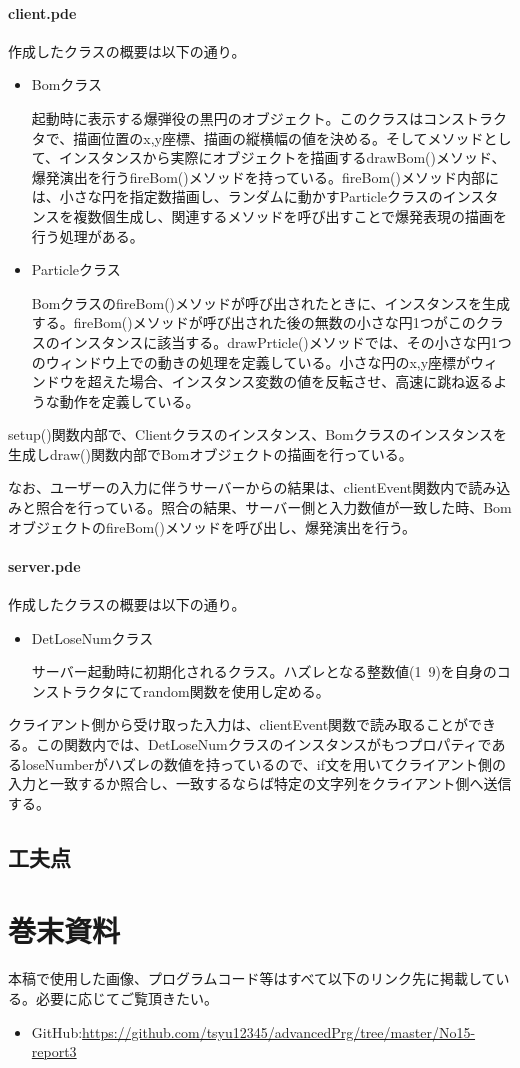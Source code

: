 \documentclass[dvipdfmx]{jsarticle}
\begin{document}
\paragraph{client.pde}
作成したクラスの概要は以下の通り。
\begin{itemize}
  \item Bomクラス\par
  起動時に表示する爆弾役の黒円のオブジェクト。このクラスはコンストラクタで、描画位置のx,y座標、描画の縦横幅の値を決める。そしてメソッドとして、インスタンスから実際にオブジェクトを描画するdrawBom()メソッド、爆発演出を行うfireBom()メソッドを持っている。fireBom()メソッド内部には、小さな円を指定数描画し、ランダムに動かすParticleクラスのインスタンスを複数個生成し、関連するメソッドを呼び出すことで爆発表現の描画を行う処理がある。
  \item Particleクラス\par
  BomクラスのfireBom()メソッドが呼び出されたときに、インスタンスを生成する。fireBom()メソッドが呼び出された後の無数の小さな円1つがこのクラスのインスタンスに該当する。drawPrticle()メソッドでは、その小さな円1つのウィンドウ上での動きの処理を定義している。小さな円のx,y座標がウィンドウを超えた場合、インスタンス変数の値を反転させ、高速に跳ね返るような動作を定義している。
\end{itemize}
setup()関数内部で、Clientクラスのインスタンス、Bomクラスのインスタンスを生成しdraw()関数内部でBomオブジェクトの描画を行っている。\par
なお、ユーザーの入力に伴うサーバーからの結果は、clientEvent関数内で読み込みと照合を行っている。照合の結果、サーバー側と入力数値が一致した時、BomオブジェクトのfireBom()メソッドを呼び出し、爆発演出を行う。
\paragraph{server.pde}
作成したクラスの概要は以下の通り。
\begin{itemize}
  \item DetLoseNumクラス\par
  サーバー起動時に初期化されるクラス。ハズレとなる整数値(1~9)を自身のコンストラクタにてrandom関数を使用し定める。
\end{itemize}
クライアント側から受け取った入力は、clientEvent関数で読み取ることができる。この関数内では、DetLoseNumクラスのインスタンスがもつプロパティであるloseNumberがハズレの数値を持っているので、if文を用いてクライアント側の入力と一致するか照合し、一致するならば特定の文字列をクライアント側へ送信する。
\subsection{工夫点}

\section{巻末資料}
本稿で使用した画像、プログラムコード等はすべて以下のリンク先に掲載している。必要に応じてご覧頂きたい。
\begin{itemize}
  \item GitHub:\url{https://github.com/tsyu12345/advancedPrg/tree/master/No15-report3}
\end{itemize}
\end{document}
